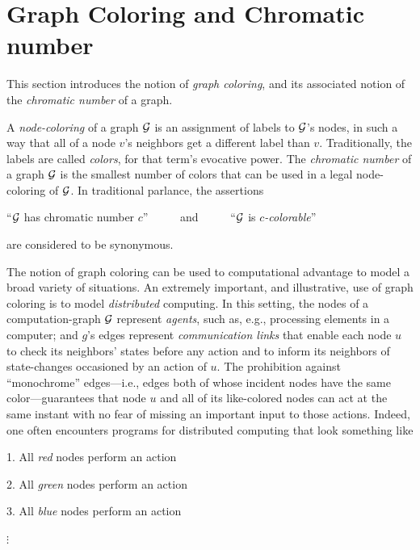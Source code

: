
\section{Graph Coloring and Chromatic number}
\label{sec:graph-color}

This section introduces the notion of {\it graph coloring}, and its
associated notion of the {\it chromatic number}
 of a graph.

A {\it node-coloring}  of a graph $\mbox{$\cal G$}$ is
an assignment of labels to $\mbox{$\cal G$}$'s nodes, in such a way that all of a
node $v$'s neighbors get a different label than $v$.  Traditionally,
the labels are called {\it colors}, for that term's evocative power.
The {\it chromatic number}  of a graph
$\mbox{$\cal G$}$ is the smallest number of colors that can be used in a legal
node-coloring of $\mbox{$\cal G$}$.  In traditional parlance, the assertions

``$\mbox{$\cal G$}$ has chromatic number $c$'' \ \ \ \ \ and \ \ \ \ \
``$\mbox{$\cal G$}$ is {\it $c$-colorable}''

\noindent
are considered to be synonymous.

The notion of graph coloring can be used to computational advantage to
model a broad variety of situations.  An extremely important, and
illustrative, use of graph coloring is to model {\it distributed}
computing.  In this setting, the nodes of a computation-graph $\mbox{$\cal G$}$
represent {\it agents}, such as, e.g., processing elements in a
computer; and $g$'s edges represent {\it communication links} that
enable each node $u$ to check its neighbors' states before any action
and to inform its neighbors of state-changes occasioned by an action
of $u$.  The prohibition against ``monochrome'' edges---i.e., edges
both of whose incident nodes have the same color---guarantees that
node $u$ and all of its like-colored nodes can act at the same instant
with no fear of missing an important input to those actions.  Indeed,
one often encounters programs for distributed computing that look
something like

1. All {\em red} nodes perform an action

2. All {\em green} nodes perform an action

3. All {\em blue} nodes perform an action

\hspace*{1in} $\vdots$


